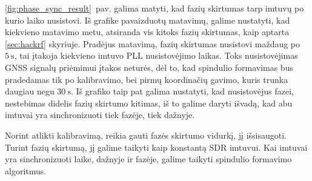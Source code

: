 \documentclass[main.tex]{subfiles}
\begin{document}
\ref{fig:phase_sync_result}~pav. galima matyti, kad fazių skirtumas tarp
imtuvų po kurio laiko nusistovi. Iš grafike pavaizduotų matavimų,
galime nustatyti, kad kiekvieno matavimo metu, atsiranda vis kitoks fazių skirtumas,
kaip aptarta \ref{sec:hackrf} skyriuje.
Pradėjus matavimą, fazių skirtumas nusistovi maždaug po $5\ \mathrm{s}$, tai
įtakoja kiekvieno imtuvo PLL nusistovėjimo laikas. Toks nusistovėjimas
GNSS signalų priėmimui įtakos neturės, dėl to, kad spindulio formavimas
bus pradedamas tik po kalibravimo, bei pirmų koordinačių gavimo,
kuris trunka daugiau negu $30\ \mathrm{s}$.
Iš grafiko taip pat galima nustatyti, kad nusistovėjus fazei, nestebimas didelis fazių skirtumo
kitimas, iš to galime daryti išvadą, kad abu imtuvai yra sinchronizuoti tiek fazėje,
tiek dažnyje.

Norint atlikti kalibravimą, reikia gauti fazės skirtumo vidurkį, jį išsisaugoti.
Turint fazių skirtumą, jį galime taikyti kaip konstantą SDR imtuvui. Kai imtuvai
yra sinchronizuoti laike, dažnyje ir fazėje, galime taikyti spindulio formavimo
algoritmus.
\end{document}
